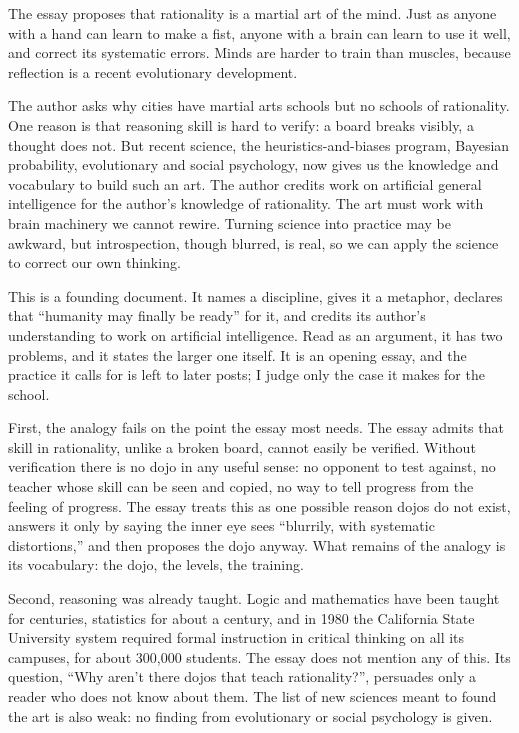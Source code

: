 \begin{afterword}
\summaryhead

The essay proposes that rationality is a martial art of the mind. Just as anyone with a hand can learn to make a fist, anyone with a brain can learn to use it well, and correct its systematic errors. Minds are harder to train than muscles, because reflection is a recent evolutionary development.

The author asks why cities have martial arts schools but no schools of rationality. One reason is that reasoning skill is hard to verify: a board breaks visibly, a thought does not. But recent science, the heuristics-and-biases program, Bayesian probability, evolutionary and social psychology, now gives us the knowledge and vocabulary to build such an art. The author credits work on artificial general intelligence for the author's knowledge of rationality. The art must work with brain machinery we cannot rewire. Turning science into practice may be awkward, but introspection, though blurred, is real, so we can apply the science to correct our own thinking.

\responsehead

This is a founding document. It names a discipline, gives it a metaphor, declares that ``humanity may finally be ready'' for it, and credits its author's understanding to work on artificial intelligence. Read as an argument, it has two problems, and it states the larger one itself. It is an opening essay, and the practice it calls for is left to later posts; I judge only the case it makes for the school.

First, the analogy fails on the point the essay most needs. The essay admits that skill in rationality, unlike a broken board, cannot easily be verified. Without verification there is no dojo in any useful sense: no opponent to test against, no teacher whose skill can be seen and copied, no way to tell progress from the feeling of progress. The essay treats this as one possible reason dojos do not exist, answers it only by saying the inner eye sees ``blurrily, with systematic distortions,'' and then proposes the dojo anyway. What remains of the analogy is its vocabulary: the dojo, the levels, the training.

Second, reasoning was already taught. Logic and mathematics have been taught for centuries, statistics for about a century, and in 1980 the California State University system required formal instruction in critical thinking on all its campuses, for about 300,000 students. The essay does not mention any of this. Its question, ``Why aren't there dojos that teach rationality?'', persuades only a reader who does not know about them. The list of new sciences meant to found the art is also weak: no finding from evolutionary or social psychology is given.


\end{afterword}
